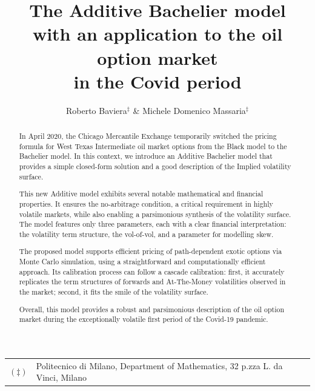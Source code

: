 \documentclass[12pt]{article}
\theoremstyle{definition}
\theoremstyle{remark}
\numberwithin{theorem}{section}
\numberwithin{proposition}{section}
\numberwithin{lemma}{section}
\numberwithin{corollary}{section}
\numberwithin{definition}{section}
\numberwithin{remark}{section}
\numberwithin{example}{section}
\begin{document}
	\newlength\tindent
	\setlength{\tindent}{\parindent}
	\setlength{\parindent}{0pt}
	\renewcommand{\indent}{\hspace*{\tindent}}
	
	\begin{savenotes}
		\title{
			\bf{ 
The Additive Bachelier model \\
 with an application to the oil option market \\
 in the Covid period
		}}
		\author{
			Roberto Baviera$^\ddagger$  \&
			Michele Domenico Massaria$^\ddagger$ 
		}
		
		\maketitle
		
		\begin{tabular}{ll}
			$(\ddagger)$ &  Politecnico di Milano, Department of Mathematics, 32 p.zza L. da Vinci, Milano \\
		\end{tabular}
	\end{savenotes}
	
	\vspace{0.5cm}
	
	\begin{abstract}	
		\noindent
In April 2020, the Chicago Mercantile Exchange temporarily switched the pricing formula for West Texas Intermediate oil market options from the Black model to the Bachelier model. In this context, we introduce an Additive Bachelier model that provides a simple closed-form solution and a good description of the Implied volatility surface.

		\noindent
This new Additive model exhibits several notable mathematical and financial properties. It ensures the no-arbitrage condition, a critical requirement in highly volatile markets, while also enabling a parsimonious synthesis of the volatility surface. The model features only three parameters, each with a clear financial interpretation: the volatility term structure, the vol-of-vol, and a parameter for modelling skew.

		\noindent
The proposed model supports efficient pricing of path-dependent exotic options via Monte Carlo simulation, using a straightforward and computationally efficient approach. Its calibration process can follow a cascade calibration: first, it accurately replicates the term structures of forwards and At-The-Money volatilities observed in the market; second, it fits the smile of the volatility surface.

		\noindent
Overall, this model provides a robust and parsimonious description of the oil option market during the exceptionally volatile first period of the Covid-19 pandemic.

	\end{abstract}
	
\end{document}
